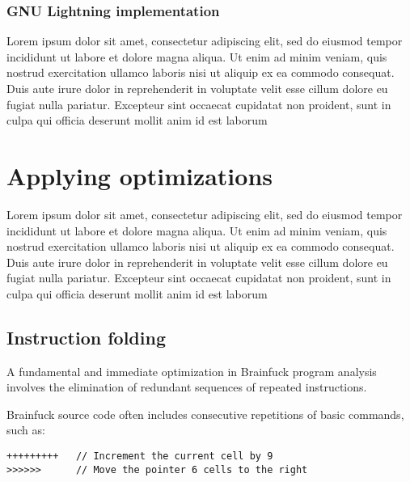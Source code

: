 \subsubsection{GNU Lightning implementation}
\label{sec:ch2sec2sub2sec2}

\par Lorem ipsum dolor sit amet, consectetur adipiscing elit, sed do eiusmod tempor incididunt ut labore et dolore magna aliqua. Ut enim ad minim veniam, quis nostrud exercitation ullamco laboris nisi ut aliquip ex ea commodo consequat. Duis aute irure dolor in reprehenderit in voluptate velit esse cillum dolore eu fugiat nulla pariatur. Excepteur sint occaecat cupidatat non proident, sunt in culpa qui officia deserunt mollit anim id est laborum

\section{Applying optimizations}
\label{sec:ch2sec3}

\par Lorem ipsum dolor sit amet, consectetur adipiscing elit, sed do eiusmod tempor incididunt ut labore et dolore magna aliqua. Ut enim ad minim veniam, quis nostrud exercitation ullamco laboris nisi ut aliquip ex ea commodo consequat. Duis aute irure dolor in reprehenderit in voluptate velit esse cillum dolore eu fugiat nulla pariatur. Excepteur sint occaecat cupidatat non proident, sunt in culpa qui officia deserunt mollit anim id est laborum

\subsection{Instruction folding}
\label{subsec:ch2sec3sec1}

\par A fundamental and immediate optimization in Brainfuck program analysis involves the elimination of redundant sequences of repeated instructions.

\par Brainfuck source code often includes consecutive repetitions of basic commands, such as:

\begin{verbatim}
+++++++++   // Increment the current cell by 9
>>>>>>      // Move the pointer 6 cells to the right
\end{verbatim}

